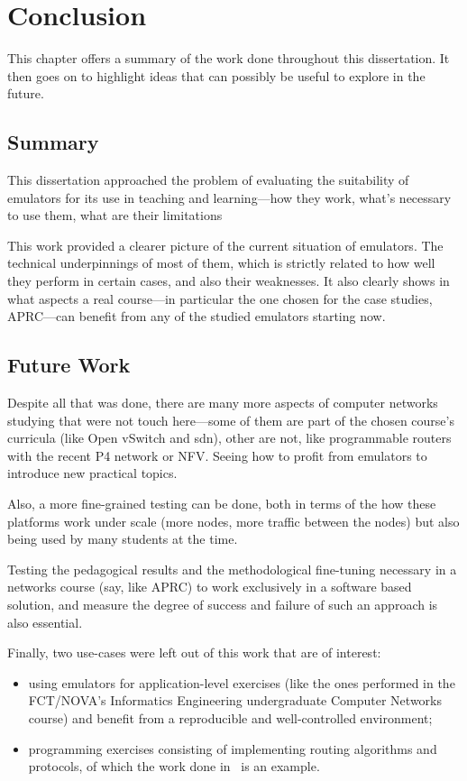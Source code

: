 
\chapter{Conclusion}
\label{ch:conclusion}

This chapter offers a summary of the work done throughout this dissertation.
It then goes on to highlight ideas that can possibly be useful to explore in the future.

\section{Summary}

This dissertation approached the problem of evaluating the suitability of emulators for its use in teaching and learning---how they work, what's necessary to use them, what are their limitations\textellipsis

This work provided a clearer picture of the current situation of emulators.
The technical underpinnings of most of them, which is strictly related to how well they perform in certain cases, and also their weaknesses.
It also clearly shows in what aspects a real course---in particular the one chosen for the case studies, APRC---can benefit from any of the studied emulators starting now.

\section{Future Work}

Despite all that was done, there are many more aspects of computer networks studying that were not touch here---some of them are part of the chosen course's curricula (like Open vSwitch and \gls{sdn}), other are not, like programmable routers with the recent P4 network or NFV.
Seeing how to profit from emulators to introduce new practical topics.

Also, a more fine-grained testing can be done, both in terms of the how these platforms work under scale (more nodes, more traffic between the nodes) but also being used by many students at the time.

Testing the pedagogical results and the methodological fine-tuning necessary in a networks course (say, like APRC) to work exclusively in a software based solution, and measure the degree of success and failure of such an approach is also essential.

Finally, two use-cases were left out of this work that are of interest:
\begin{itemize}
  \item using emulators for application-level exercises (like the ones performed in the FCT/NOVA's Informatics Engineering undergraduate Computer Networks course) and benefit from a reproducible and well-controlled environment;
  \item programming exercises consisting of implementing routing algorithms and protocols, of which the work done in~\cite{teachandlearnmininet} is an example.
\end{itemize}

